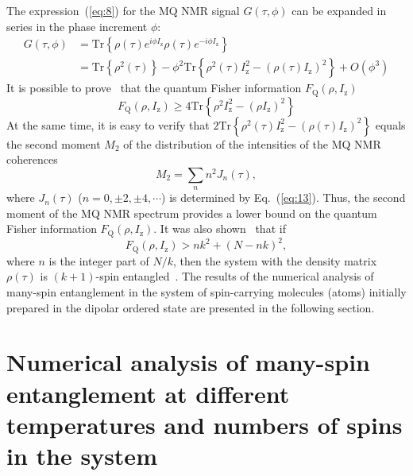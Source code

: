 The expression~(\ref{eq:8}) for the MQ NMR signal $G(\tau,\phi)$ can be expanded in series in the phase increment $\phi$:
%
\begin{equation}
    \begin{split}
        \label{eq:17}
        G(\tau,\phi)
        & = \mathrm{Tr} \left\{
            \rho(\tau) e^{i \phi I_\mathrm{z} }
            \rho(\tau) e^{-i\phi I_\mathrm{z}}
        \right\}  \\
        & = \mathrm{Tr} \left\{ \rho^2(\tau) \right\}
        - \phi^2 \mathrm{Tr} \left\{
            \rho^2(\tau) I^2_\mathrm{z}
            - (\rho(\tau) I_\mathrm{z})^2
        \right\}
        + O(\phi^3)
    \end{split}
\end{equation}
%
It is possible to prove~\cite{Girolami_2017} that the quantum Fisher information $F_\mathrm{Q}(\rho,I_\mathrm{z})$~\cite{Helstrom_1976}
%
\begin{equation}
    \label{eq:18}
    F_\mathrm{Q}(\rho,I_\mathrm{z}) \geq 4 \mathrm{Tr} \left\{ \rho^2 I^2_\mathrm{z} - (\rho I_\mathrm{z})^2 \right\}
\end{equation}
%
At the same time, it is easy to verify that $2 \mathrm{Tr} \left\{ \rho^2(\tau) I_\mathrm{z}^2 - \left( \rho(\tau) I_\mathrm{z} \right)^2 \right\}$ equals the second moment $M_2$ of the distribution of the intensities of the MQ NMR coherences~\cite{Khitrin_1997}
%
\begin{equation}
    \label{eq:19}
    M_2 = \sum_{n} n^2 J_n (\tau) ,
\end{equation}
%
where $J_n(\tau)$ ($n=0,\pm 2, \pm 4, \cdots$) is determined by Eq.~(\ref{eq:13}).
Thus, the second moment of the MQ NMR spectrum provides a lower bound on the quantum Fisher information $F_\mathrm{Q}(\rho,I_\mathrm{z})$.
It was also shown~\cite{T_th_2014,Pezz__2018} that if
%
\begin{equation}
    \label{eq:20}
    F_\mathrm{Q} (\rho,I_\mathrm{z}) > n k^2 + (N - n k)^2,
\end{equation}
%
where $n$ is the integer part of ${N/k}$, then the system with the density matrix $\rho(\tau)$ is $(k+1)$-spin entangled~\cite{Pezz__2009,Hyllus_2012,T_th_2012}.
The results of the numerical analysis of many-spin entanglement in the system of spin-carrying molecules (atoms) initially prepared in the dipolar ordered state are presented in the following section.



\section{Numerical analysis of many-spin entanglement at different temperatures and numbers of spins in the system}
\label{sec:5}

